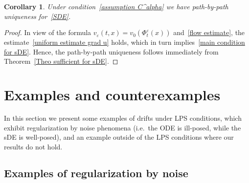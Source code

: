 \documentclass[a4paper,10pt]{article}
\newtheorem{corollary}[theorem]{Corollary}
\newcommand\1{\mathbbm{1}}
\newcommand{\eps}{\varepsilon}
\numberwithin{equation}{section}
\begin{document}
\begin{corollary}
\label{Corollary sDE Holder}Under condition~\eqref{assumption C^alpha} we have path-by-path uniqueness for~\eqref{SDE}.
\end{corollary}

\begin{proof}
In view of the formula $v_{\eps}(t,x)  =v_{0}(\Phi^{\eps}_t(x))$ and~\eqref{flow estimate}, the estimate~\eqref{uniform estimate grad u} holds, which in turn implies~\eqref{main condition for sDE}. Hence, the path-by-path uniqueness follows immediately from Theorem~\ref{Theo sufficient for sDE}.
\end{proof}


\section{Examples and counterexamples}\label{ex_section}

In this section we present some examples of drifts under LPS conditions, which exhibit regularization by noise phenomena (i.e.~the ODE is ill-posed, while the sDE is well-posed), and an example outside of the LPS conditions where our results do not hold.

\subsection{Examples of regularization by noise}
\end{document}
